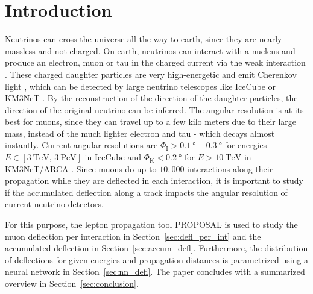 \section{Introduction}\label{sec:introduction}
Neutrinos can cross the universe all the way to earth, since they are 
nearly massless and not charged. On earth, neutrinos can interact 
with a nucleus and produce an electron, muon or tau in the charged current 
via the weak interaction \cite{}. These charged daughter particles are very 
high-energetic and emit Cherenkov light \cite{}, which can be detected 
by large neutrino telescopes like IceCube \cite{IceCube_Instrumentation} or 
KM3NeT \cite{KM3NeT_Design}. 
By the reconstruction of the direction of the daughter particles, the direction 
of the original neutrino can be inferred. The angular resolution is at its 
best for muons, since they can travel up to a few kilo meters due to their 
large mass, instead of the much lighter electron and tau - which decays almost 
instantly. Current angular resolutions are 
$\Phi_{\text{I}} > \SI{0.1}{\degree} - \SI{0.3}{\degree}$ for energies 
$E \in [\SI{3}{\tera\electronvolt},\,\SI{3}{\peta\electronvolt}]$ in IceCube 
\cite{IceCube_Resolution2021} 
and 
$\Phi_{\text{K}} < \SI{0.2}{\degree}$ for $E > \SI{10}{\tera\electronvolt}$ in 
KM3NeT/ARCA \cite{KM3NeT_Resolution2021}.
Since muons do up to $10,000$ interactions along their propagation while they 
are deflected in each interaction, it is important to study if the accumulated 
deflection along a track impacts the angular resolution of current 
neutrino detectors. 

For this purpose, the lepton propagation 
tool PROPOSAL \cite{koehne2013proposal, dunsch_2018_proposal_improvements} is used to study the muon deflection per interaction in 
Section~\ref{sec:defl_per_int} and the 
accumulated deflection in Section~\ref{sec:accum_defl}. Furthermore, 
the distribution of deflections for given energies and propagation distances 
is parametrized using a neural network in Section~\ref{sec:nn_defl}. The 
paper concludes with a summarized overview in Section~\ref{sec:conclusion}.




